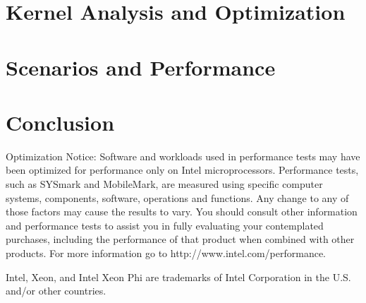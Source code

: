 \section{Kernel Analysis and Optimization}
\label{sec:implementation}


\section{Scenarios and Performance}
\label{sec:benchmarks}


\section{Conclusion}
\label{sec:conclusion}



{ \scriptsize

\noindent Optimization Notice: Software and workloads used in
performance tests may have been optimized for performance only on
Intel microprocessors.  Performance tests, such as SYSmark and
MobileMark, are measured using specific computer systems,
components, software, operations and functions.  Any change to any
of those factors may cause the results to vary.  You should
consult other information and performance tests to assist you in
fully evaluating your contemplated purchases, including the
performance of that product when combined with other products.
For more information go to http://www.intel.com/performance.

\noindent Intel, Xeon, and Intel Xeon
Phi are trademarks of Intel Corporation in the U.S. and/or other
countries.

}

